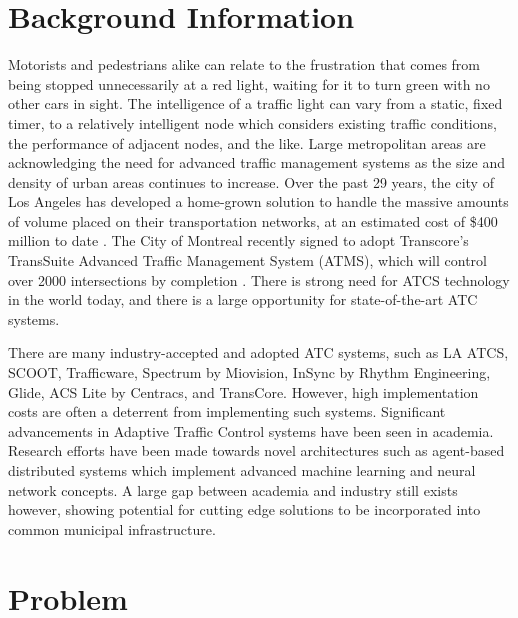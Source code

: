 \documentclass[a4paper,11pt]{report}
\begin{document}
\begin{multicols}{2}
\section{Background Information}
Motorists and pedestrians alike can relate to the frustration that comes from being stopped unnecessarily at a red light, waiting for it to turn green with no other cars in sight.
The intelligence of a traffic light can vary from a static, fixed timer, to a relatively intelligent node which considers existing traffic conditions, the performance of adjacent nodes, and the like.
Large metropolitan areas are acknowledging the need for advanced traffic management systems as the size and density of urban areas continues to increase.
Over the past 29 years, the city of Los Angeles has developed a home-grown solution to handle the massive amounts of volume placed on their transportation networks, at an estimated cost of \$400 million to date \cite{la-atcs-article}.
The City of Montreal recently signed to adopt Transcore's TransSuite Advanced Traffic Management System (ATMS), which will control over 2000 intersections by completion \cite{montreal-transcore}.
There is strong need for ATCS technology in the world today, and there is a large opportunity for state-of-the-art ATC systems.

There are many industry-accepted and adopted ATC systems, such as LA ATCS, SCOOT, Trafficware, Spectrum by Miovision, InSync by Rhythm Engineering, Glide, ACS Lite by Centracs, and TransCore.
However, high implementation costs are often a deterrent from implementing such systems.
Significant advancements in Adaptive Traffic Control systems have been seen in academia.
Research efforts have been made towards novel architectures such as agent-based distributed systems which implement advanced machine learning and neural network concepts\cite{1688100, 5073360, uot-article}.
A large gap between academia and industry still exists however, showing potential for cutting edge solutions to be incorporated into common municipal infrastructure.

\section{Problem}


\end{multicols}
\end{document}
